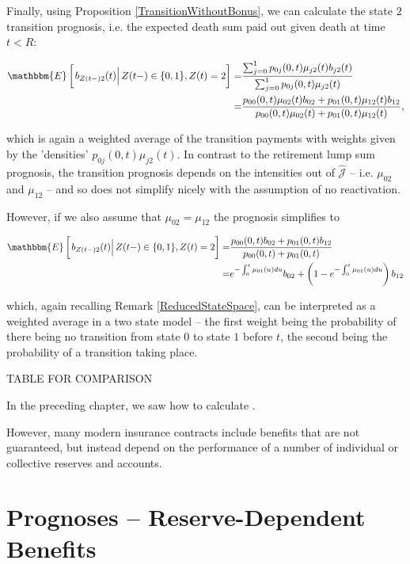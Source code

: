\documentclass{article}
\newcommand{\1}[1]{\mathbbm{1}_{\left\lbrace #1 \right\rbrace}}
\newcommand{\econd}[2][def]{\mathbbm{E} \left[ \left. #1 \right| #2 \right]}
\theoremstyle{break}
\theoremstyle{remark}
\numberwithin{equation}{section}
\begin{document}
Finally, using Proposition \ref{TransitionWithoutBonus}, we can calculate the state $2$ transition prognosis, i.e. the expected death sum paid out given death at time $t<R$:

\begin{align*}
    \econd[b_{Z(t-)2}(t)]{Z(t-) \in \{ 0,1 \}, Z(t)=2} =& \frac{\sum_{j=0}^1 p_{0j}(0,t) \mu_{j2}(t) b_{j2}(t)}{\sum_{j=0}^1 p_{0j}(0,t) \mu_{j2}(t)} \\
    =&\frac{p_{00}(0,t) \mu_{02}(t) b_{02} + p_{01}(0,t) \mu_{12}(t) b_{12}}{p_{00}(0,t) \mu_{02}(t) + p_{01}(0,t) \mu_{12}(t)},
\end{align*}

which is again a weighted average of the transition payments with weights given by the 'densities' $p_{0j}(0,t) \mu_{j2}(t)$. In contrast to the retirement lump sum prognosis, the transition prognosis depends on the intensities out of $\hat{\mathcal{J}}$ -- i.e. $\mu_{02}$ and $\mu_{12}$ -- and so does not simplify nicely with the assumption of no reactivation.

However, if we also assume that $\mu_{02}=\mu_{12}$ the prognosis simplifies to

\begin{align*}
    \econd[b_{Z(t-)2}(t)]{Z(t-) \in \{ 0,1 \}, Z(t)=2} =&\frac{p_{00}(0,t) b_{02} + p_{01}(0,t) b_{12}}{p_{00}(0,t) + p_{01}(0,t)} \\
    =& e^{-\int_0^t \mu_{01}(u)du} b_{02} + \left(1 - e^{-\int_0^t \mu_{01}(u)du} \right) b_{12}
\end{align*}

which, again recalling Remark \ref{ReducedStateSpace}, can be interpreted as a weighted average in a two state model -- the first weight being the probability of there being no transition from state $0$ to state $1$ before $t$, the second being the probability of a transition taking place.

TABLE FOR COMPARISON

In the preceding chapter, we saw how to calculate .

However, many modern insurance contracts include benefits that are not guaranteed, but instead depend on the performance of a number of individual or collective reserves and accounts. 

\newpage
\section{Prognoses -- Reserve-Dependent Benefits} \label{ChapReserveDepBen}
\end{document}
